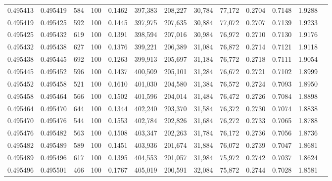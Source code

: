 \begin{tabular}{rrrrrrrrrrrrr}
0.495413 & 0.495419 &   584 & 100 &                                     0.1462 & 397,383 & 208,227 &  30,784 &  77,172 & 0.2704 & 0.7148 & 1.9288 \\
0.495419 & 0.495425 &   592 & 100 &                                     0.1445 & 397,975 & 207,635 &  30,884 &  77,072 & 0.2707 & 0.7139 & 1.9233 \\
0.495425 & 0.495432 &   619 & 100 &                                     0.1391 & 398,594 & 207,016 &  30,984 &  76,972 & 0.2710 & 0.7130 & 1.9176 \\
0.495432 & 0.495438 &   627 & 100 &                                     0.1376 & 399,221 & 206,389 &  31,084 &  76,872 & 0.2714 & 0.7121 & 1.9118 \\
0.495438 & 0.495445 &   692 & 100 &                                     0.1263 & 399,913 & 205,697 &  31,184 &  76,772 & 0.2718 & 0.7111 & 1.9054 \\
0.495445 & 0.495452 &   596 & 100 &                                     0.1437 & 400,509 & 205,101 &  31,284 &  76,672 & 0.2721 & 0.7102 & 1.8999 \\
0.495452 & 0.495458 &   521 & 100 &                                     0.1610 & 401,030 & 204,580 &  31,384 &  76,572 & 0.2724 & 0.7093 & 1.8950 \\
0.495458 & 0.495464 &   566 & 100 &                                     0.1502 & 401,596 & 204,014 &  31,484 &  76,472 & 0.2726 & 0.7084 & 1.8898 \\
0.495464 & 0.495470 &   644 & 100 &                                     0.1344 & 402,240 & 203,370 &  31,584 &  76,372 & 0.2730 & 0.7074 & 1.8838 \\
0.495470 & 0.495476 &   544 & 100 &                                     0.1553 & 402,784 & 202,826 &  31,684 &  76,272 & 0.2733 & 0.7065 & 1.8788 \\
0.495476 & 0.495482 &   563 & 100 &                                     0.1508 & 403,347 & 202,263 &  31,784 &  76,172 & 0.2736 & 0.7056 & 1.8736 \\
0.495482 & 0.495489 &   589 & 100 &                                     0.1451 & 403,936 & 201,674 &  31,884 &  76,072 & 0.2739 & 0.7047 & 1.8681 \\
0.495489 & 0.495496 &   617 & 100 &                                     0.1395 & 404,553 & 201,057 &  31,984 &  75,972 & 0.2742 & 0.7037 & 1.8624 \\
0.495496 & 0.495501 &   466 & 100 &                                     0.1767 & 405,019 & 200,591 &  32,084 &  75,872 & 0.2744 & 0.7028 & 1.8581 \\

\end{tabular}
